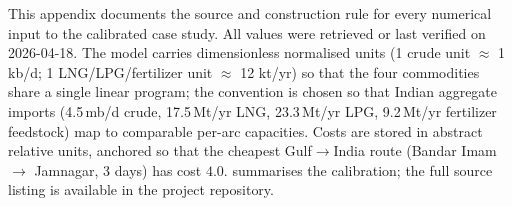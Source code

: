 \documentclass[final,3p,authoryear]{elsarticle}
\theoremstyle{definition}
\begin{document}
This appendix documents the source and construction rule for every
numerical input to the calibrated case study. All values were retrieved
or last verified on 2026-04-18. The model carries dimensionless
normalised units (1 crude unit $\approx$ 1 kb/d; 1 LNG/LPG/fertilizer
unit $\approx$ 12 kt/yr) so that the four commodities share a single
linear program; the convention is chosen so that Indian aggregate
imports (4.5\,mb/d crude, 17.5\,Mt/yr LNG, 23.3\,Mt/yr LPG, 9.2\,Mt/yr
fertilizer feedstock) map to comparable per-arc capacities. Costs are
stored in abstract relative units, anchored so that the cheapest
Gulf$\rightarrow$India route (Bandar Imam $\rightarrow$ Jamnagar, 3
days) has cost $4.0$.  summarises the
calibration; the full source listing is available in the project
repository.

\end{document}
